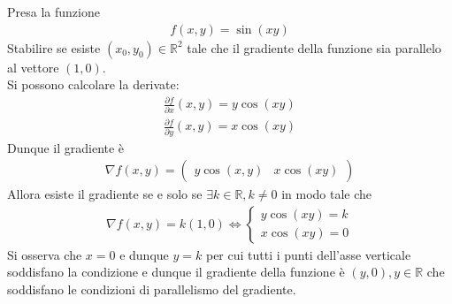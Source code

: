 \documentclass[a4paper, oneside]{book}
\begin{document}
\begin{example}
    Presa la funzione
    \begin{gather*}
        f(x, y) = \sin(xy)
    \end{gather*}
    Stabilire se esiste $(x_0, y_0)\in \mathbb{R}^{2}$  tale che il gradiente
    della funzione sia parallelo al vettore $(1, 0)$. \\
    Si possono calcolare la derivate:
    \begin{gather*}
        \frac{\partial f}{\partial x}(x, y) = y\cos(xy) \\
        \frac{\partial f}{\partial y}(x, y) = x\cos(xy)  
    \end{gather*} 
    Dunque il gradiente è 
    \begin{gather*}
        \nabla f(x, y) = \begin{pmatrix}
            y\cos(x, y) & x\cos(xy)
        \end{pmatrix}
    \end{gather*}
    Allora esiste il gradiente se e solo se $\exists k \in \mathbb{R}, k \neq 0$ in modo
    tale che
    \begin{gather*}
        \nabla f(x, y) = k(1, 0) \Longleftrightarrow \left\{\begin{array}{l}
            y\cos(xy) = k \\
            x\cos(xy) = 0
        \end{array}\right.
    \end{gather*}
    Si osserva che $x = 0$ e dunque $y =k$ per cui tutti i punti
    dell'asse verticale soddisfano la condizione e dunque il gradiente
    della funzione è $(y, 0) , y \in \mathbb{R}$ che soddisfano le condizioni
    di parallelismo del gradiente.  
\end{example}
\end{document}
